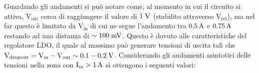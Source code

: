 Guardando gli andamenti si può notare come, al momento in cui il circuito si attiva, $\mathrm{V_{out}}$ cerca di raggiungere il valore di $1 \rm \; V$ (stabilito attraverso $\mathrm{V_{ref}}$), ma nel far questo è limitato da $\mathrm{V_{in}}$ di cui ne segue l'andamento tra $0.5 \rm \, A$ e $0.75 \rm \, A$ restando ad una distanza di $\sim 100 \rm \; mV$. 
Questo è dovuto alle caratteristiche del regolatore LDO, il quale al massimo può generare tensioni di uscita tali che $\mathrm{V_{dropout}=V_{in}-V_{out}\sim 0.1-0.2 \rm \; V}$. 
Considerando gli andamenti asintotici delle tensioni nella zona con $\mathrm{I_{in}}>1\rm \, A$ si ottengono i seguenti valori:


